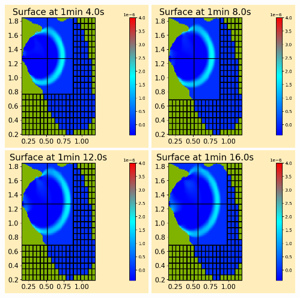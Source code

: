 \documentclass[11pt]{article}
\begin{document}
\vskip 10pt 
\includegraphics[width=0.475\textwidth]{frame0016fig0.png}
\vskip 10pt 
\includegraphics[width=0.475\textwidth]{frame0017fig0.png}
\vskip 10pt 
\includegraphics[width=0.475\textwidth]{frame0018fig0.png}
\vskip 10pt 
\includegraphics[width=0.475\textwidth]{frame0019fig0.png}
\end{document}

